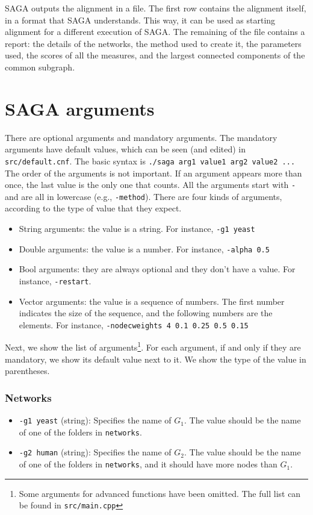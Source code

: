 \documentclass[]{article}
\begin{document}
SAGA outputs the alignment in a file. The first row contains the alignment itself, in a format that SAGA understands. This way, it can be used as starting alignment for a different execution of SAGA. The remaining of the file contains a report: the details of the networks, the method used to create it, the parameters used, the scores of all the measures, and the largest connected components of the common subgraph.


\section{SAGA arguments}\label{b:args}
There are optional arguments and mandatory arguments. The mandatory arguments have default values, which can be seen (and edited) in \texttt{src/default.cnf}. The basic syntax is \texttt{./saga arg1 value1 arg2 value2 ...} The order of the arguments is not important. If an argument appears more than once, the last value is the only one that counts. All the arguments start with \texttt{-} and are all in lowercase (e.g., \texttt{-method}). There are four kinds of arguments, according to the type of value that they expect.
\begin{itemize}
\item String arguments: the value is a string. For instance, \texttt{-g1 yeast}
\item Double arguments: the value is a number. For instance, \texttt{-alpha 0.5}
\item Bool arguments: they are always optional and they don't have a value. For instance, \texttt{-restart}.
\item Vector arguments: the value is a sequence of numbers. The first number indicates the size of the sequence, and the following numbers are the elements. For instance, \texttt{-nodecweights 4 0.1 0.25 0.5 0.15}
\end{itemize}

Next, we show the list of arguments\footnote{Some arguments for advanced functions have been omitted. The full list can be found in \texttt{src/main.cpp}}. For each argument, if and only if they are mandatory, we show its default value next to it. We show the type of the value in parentheses.
\subsubsection*{Networks}
\begin{itemize}
\item\texttt{-g1 yeast} (string): Specifies the name of $G_1$. The value should be the name of one of the folders in \texttt{networks}.
\item\texttt{-g2 human} (string): Specifies the name of $G_2$. The value should be the name of one of the folders in \texttt{networks}, and it should have more nodes than $G_1$.
\end{itemize}
\end{document}
